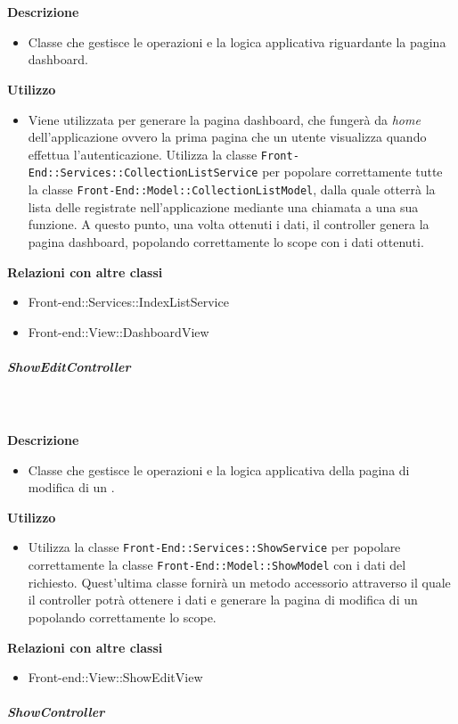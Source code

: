 				\textbf{\\ \\ Descrizione} 
					\begin{itemize}
						\item[] Classe che gestisce le operazioni e la logica applicativa riguardante la pagina dashboard.
					\end{itemize}      
				\textbf{Utilizzo}  
					\begin{itemize}
						\item[] Viene utilizzata per generare la pagina dashboard, che fungerà da \textit{home} dell'applicazione ovvero la prima pagina che un utente visualizza quando effettua l'autenticazione. Utilizza la classe \texttt{Front-End::Services::CollectionListService} per popolare correttamente tutte la classe \texttt{Front-End::Model::CollectionListModel}, dalla quale otterrà la lista delle  registrate nell'applicazione mediante una chiamata a una sua funzione. A questo punto, una volta ottenuti i dati, il controller genera la pagina dashboard, popolando correttamente lo scope con i dati ottenuti.
					\end{itemize}
					\textbf{Relazioni con altre classi}
					\begin{itemize}
							\item{Front-end::Services::IndexListService}
							\item{Front-end::View::DashboardView}
					\end{itemize}
			\subparagraph{ShowEditController}
				
				\textbf{\\ \\ Descrizione} 
					\begin{itemize}
						\item[] Classe che gestisce le operazioni e la logica applicativa della pagina di modifica di un .
					\end{itemize}      
				\textbf{Utilizzo}  
					\begin{itemize}
						\item[] Utilizza la classe \texttt{Front-End::Services::ShowService} per popolare correttamente la classe \texttt{Front-End::Model::ShowModel} con i dati del  richiesto. Quest'ultima classe fornirà un metodo accessorio attraverso il quale il controller potrà ottenere i dati e generare la pagina di modifica di un  popolando correttamente lo scope.
					\end{itemize}
					\textbf{Relazioni con altre classi}
					\begin{itemize}
							\item{Front-end::View::ShowEditView}
					\end{itemize}
			\subparagraph{ShowController}
				

